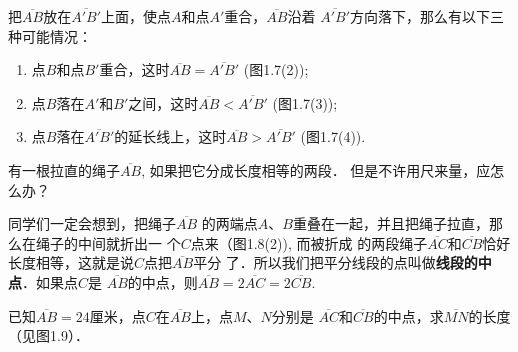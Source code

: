 把$\overline{AB}$放在$\overline{A'B'}$上面，使点$A$和点$A'$重合，$\overline{AB}$沿着
$\overline{A'B'}$方向落下，那么有以下三种可能情况：
\begin{enumerate}
	\item 点$B$和点$B'$重合，这时$\overline{AB}=\overline{A'B'}$ (图1.7(2));
	\item 点$B$落在$A'$和$B'$之间，这时$\overline{AB}<\overline{A'B'}$ (图1.7(3));
	\item 点$B$落在$\overline{A'B'}$的延长线上，这时$\overline{AB}>\overline{A'B'}$ (图1.7(4)).
\end{enumerate} 


有一根拉直的绳子$\overline{AB}$, 如果把它分成长度相等的两段．
但是不许用尺来量，应怎么办？

同学们一定会想到，把绳子$\overline{AB}$
的两端点$A$、$B$重叠在一起，并且把绳子拉直，那么在绳子的中间就折出一
个$C$点来（图1.8(2)), 而被折成
的两段绳子$\overline{AC}$和$\overline{CB}$恰好长度相等，这就是说$C$点把$\overline{AB}$平分
了．所以我们把平分线段的点叫做\textbf{线段的中点}．如果点$C$是
$\overline{AB}$的中点，则$\overline{AB}=2\overline{AC}=2\overline{CB}$.

\begin{figure}[htp]\centering
    \begin{minipage}[t]{0.48\textwidth}
    \centering
{}
    \caption{}
    \end{minipage}
    \begin{minipage}[t]{0.48\textwidth}
    \centering
    \caption{}
    \end{minipage}
    \end{figure}



\begin{example}
	已知$\overline{AB}=24$厘米，点$C$在$\overline{AB}$上，点$M$、$N$分别是
	$\overline{AC}$和$\overline{CB}$的中点，求$\overline{MN}$的长度（见图1.9）．
\end{example}

